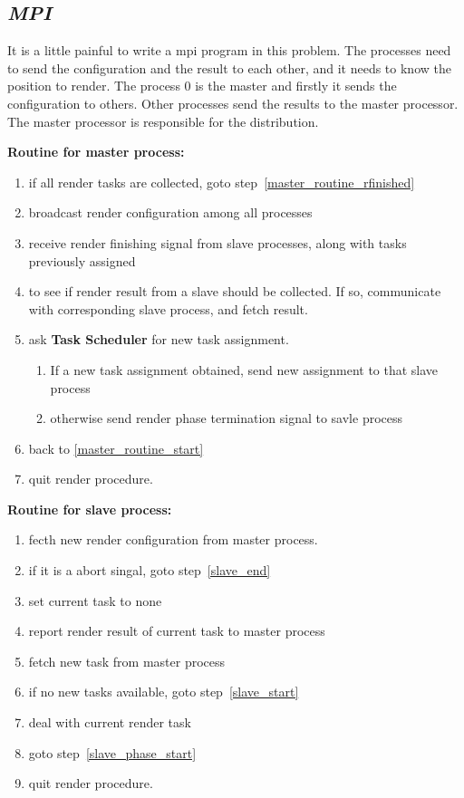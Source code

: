 \documentclass{article}
\newcommand{\mpi} { {\it MPI} }
\begin{document}
	\subsection{\mpi}
		It is a little painful to write a mpi program in this problem.
		The processes need to send the configuration and the result to each other,
		and it needs to know the position to render. The process 0 is the master
		and firstly it sends the configuration to others. Other processes send the
		results to the master processor. The master processor is responsible for
		the distribution.


		{\bf Routine for master process:}
		\begin{enumerate}
			\item \label{master_routine_start} if all render tasks are
				collected, goto step~\ref{master_routine_rfinished}
			\item broadcast render configuration among all processes
			\item receive render finishing signal from slave processes,
				along with tasks previously assigned
			\item to see if render result from a slave should be collected. If
				so, communicate with corresponding slave process, and fetch
				result.
			\item ask {\bf Task Scheduler} for new task assignment.
				\begin{enumerate}
					\item If a new task assignment obtained,
						send new assignment to that slave process
					\item otherwise send render phase termination signal
						to savle process
				\end{enumerate}
			\item back to \ref{master_routine_start}
			\item \label{master_routine_rfinished}
				quit render procedure.
		\end{enumerate}


		{\bf Routine for slave process:}
		\begin{enumerate}
			\item \label{slave_start}
				fecth new render configuration from master process.
			\item if it is a abort singal, goto step~\ref{slave_end}
			\item  set current task to none
			\item \label{slave_phase_start}
				report render result of current task to master process
			\item fetch new task from master process
			\item if no new tasks available, goto step~\ref{slave_start}
			\item deal with current render task
			\item goto step~\ref{slave_phase_start}
			\item \label{slave_end}
				quit render procedure.
		\end{enumerate}
\end{document}
